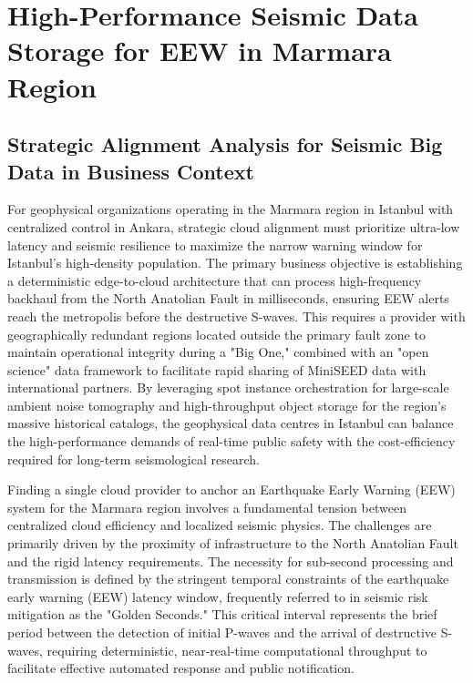 \documentclass[data,article,submit,pdftex,moreauthors]{Definitions/mdpi}
\begin{document}
\section{High-Performance Seismic Data Storage for EEW in Marmara Region}

\subsection{Strategic Alignment Analysis for Seismic Big Data in Business Context}

For geophysical organizations operating in the Marmara region in Istanbul with centralized control in Ankara, strategic cloud alignment must prioritize ultra-low latency and seismic resilience to maximize the narrow warning window for Istanbul's high-density population. The primary business objective is establishing a deterministic edge-to-cloud architecture that can process high-frequency backhaul from the North Anatolian Fault in milliseconds, ensuring EEW alerts reach the metropolis before the destructive S-waves. This requires a provider with geographically redundant regions located outside the primary fault zone to maintain operational integrity during a "Big One," combined with an "open science" data framework to facilitate rapid sharing of MiniSEED data with international partners. By leveraging spot instance orchestration for large-scale ambient noise tomography and high-throughput object storage for the region's massive historical catalogs, the geophysical data centres in Istanbul can balance the high-performance demands of real-time public safety with the cost-efficiency required for long-term seismological research.

Finding a single cloud provider to anchor an Earthquake Early Warning (EEW) system for the Marmara region involves a fundamental tension between centralized cloud efficiency and localized seismic physics. The challenges are primarily driven by the proximity of infrastructure to the North Anatolian Fault and the rigid latency requirements. The necessity for sub-second processing and transmission is defined by the stringent temporal constraints of the earthquake early warning (EEW) latency window, frequently referred to in seismic risk mitigation as the "Golden Seconds." This critical interval represents the brief period between the detection of initial P-waves and the arrival of destructive S-waves, requiring deterministic, near-real-time computational throughput to facilitate effective automated response and public notification.
\end{document}
